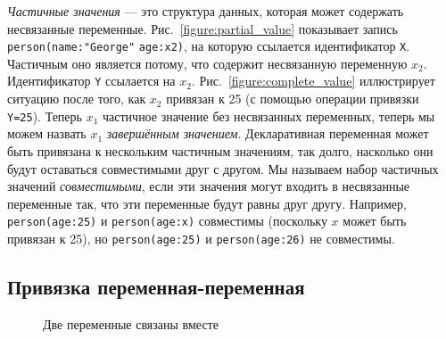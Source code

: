 \emph{Частичные значения} --- это структура данных, которая может содержать несвязанные переменные. Рис.~\ref{figure:partial_value} показывает запись \lstinline|person(name:"George"| \lstinline|age:x2)|, на которую ссылается идентификатор \lstinline|X|. Частичным оно является потому, что содержит несвязанную переменную $x_{2}$. Идентификатор \lstinline|Y| ссылается на $x_{2}$. Рис.~\ref{figure:complete_value} иллюстрирует ситуацию после того, как $x_{2}$ привязан к 25 (с помощью операции привязки \lstinline|Y=25|). Теперь $x_{1}$ частичное значение без несвязанных переменных, теперь мы можем назвать $x_{1}$ \emph{завершённым значением}. Декларативная переменная может быть привязана к нескольким частичным значениям, так долго, насколько они будут оставаться совместимыми друг с другом. Мы называем набор частичных значений \emph{совместимыми}, если эти значения могут входить в несвязанные переменные так, что эти переменные будут равны друг другу. Например, \lstinline|person(age:25)| и \lstinline|person(age:x)| совместимы (поскольку $x$ может быть привязан к 25), но \lstinline|person(age:25)| и \lstinline|person(age:26)| не совместимы.


\subsection{Привязка переменная-переменная}

\begin{figure}
\caption{Две переменные связаны вместе}
\label{figure:two_variables_bound_together}
\end{figure}

